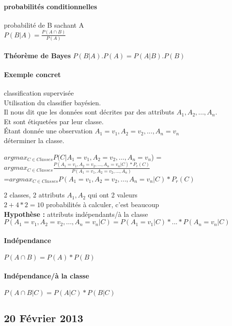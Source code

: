 \documentclass{article}
\begin{document}
\paragraph{probabilités conditionnelles}
probabilité de B sachant A \\ 
$P(B|A) = \frac{P(A \cap B)}{P(A)}$\\
\\
\textbf{Théorème de Bayes} $P(B|A).P(A) = P(A|B).P(B)$
\paragraph{Exemple concret} classification supervisée\\
Utilisation du classifier bayésien.\\
Il nous dit que les données sont décrites par des attributs $A_1,A_2,...,A_n$.\\Et sont étiquetées par leur classe.\\
Étant donnée une observation $A_1=v_1, A_2=v_2,...,A_n=v_n$\\
déterminer la classe.
\\
\begin{center}
$argmax_{C \in Classes} P(C|A_1=v_1, A_2=v_2,...,A_n=v_n$) =\\
$ argmax_{C \in Classes} \frac{P(A_1=v_1, A_2=v_2,...,A_n=v_n|C)*P_{r}(C)}{P(A_1=v_1, A_2=v_2,...,A_n)}$\\
=$ argmax_{C \in Classes} P(A_1=v_1, A_2=v_2,...,A_n=v_n|C)*P_{r}(C)$\\
\end{center} 
2 classes, 2 attributs $A_1,A_2$ qui ont 2 valeurs\\ 
$2+ 4*2 = 10$ probabilités à calculer, c'est beaucoup\\
\textbf{Hypothèse : }attributs indépendants/à la classe\\
$P(A_1=v_1, A_2=v_2,...,A_n=v_n|C)=P(A_1=v_1|C)*...*P(A_n=v_n|C)$
\paragraph{Indépendance} $P(A \cap B) = P(A)*P(B)$
\paragraph{Indépendance/à la classe} $P(A \cap B | C) = P(A|C) * P(B|C)$
\subsection{20 Février 2013}
\end{document}
